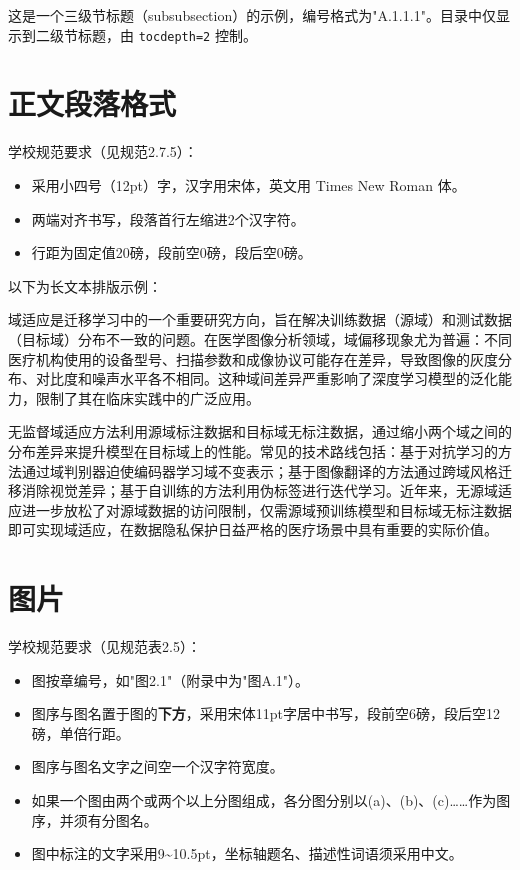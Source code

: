这是一个三级节标题（subsubsection）的示例，编号格式为"A.1.1.1"。目录中仅显示到二级节标题，由 \verb|tocdepth=2| 控制。

\section{正文段落格式}\label{sec:demo-text}

学校规范要求（见规范2.7.5）：

\begin{itemize}
  \item 采用小四号（12pt）字，汉字用宋体，英文用 Times New Roman 体。
  \item 两端对齐书写，段落首行左缩进2个汉字符。
  \item 行距为固定值20磅，段前空0磅，段后空0磅。
\end{itemize}

以下为长文本排版示例：

域适应是迁移学习中的一个重要研究方向，旨在解决训练数据（源域）和测试数据（目标域）分布不一致的问题。在医学图像分析领域，域偏移现象尤为普遍：不同医疗机构使用的设备型号、扫描参数和成像协议可能存在差异，导致图像的灰度分布、对比度和噪声水平各不相同。这种域间差异严重影响了深度学习模型的泛化能力，限制了其在临床实践中的广泛应用。

无监督域适应方法利用源域标注数据和目标域无标注数据，通过缩小两个域之间的分布差异来提升模型在目标域上的性能。常见的技术路线包括：基于对抗学习的方法通过域判别器迫使编码器学习域不变表示；基于图像翻译的方法通过跨域风格迁移消除视觉差异；基于自训练的方法利用伪标签进行迭代学习。近年来，无源域适应进一步放松了对源域数据的访问限制，仅需源域预训练模型和目标域无标注数据即可实现域适应，在数据隐私保护日益严格的医疗场景中具有重要的实际价值。

\section{图片}\label{sec:demo-figures}

学校规范要求（见规范表2.5）：

\begin{itemize}
  \item 图按章编号，如"图2.1"（附录中为"图A.1"）。
  \item 图序与图名置于图的\textbf{下方}，采用宋体11pt字居中书写，段前空6磅，段后空12磅，单倍行距。
  \item 图序与图名文字之间空一个汉字符宽度。
  \item 如果一个图由两个或两个以上分图组成，各分图分别以(a)、(b)、(c)……作为图序，并须有分图名。
  \item 图中标注的文字采用9\textasciitilde10.5pt，坐标轴题名、描述性词语须采用中文。
\end{itemize}

